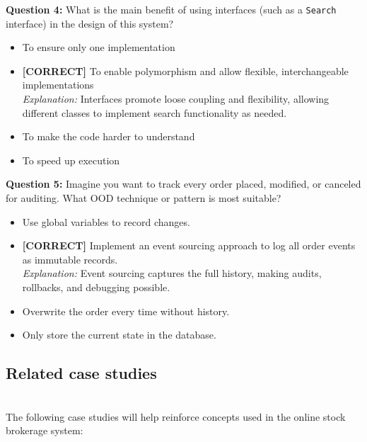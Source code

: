 \vspace{0.3cm}
\noindent
\textbf{Question 4:} What is the main benefit of using interfaces (such as a \texttt{Search} interface) in the design of this system?
\\[0.2cm]
\begin{itemize}
 \item To ensure only one implementation
 \item \textbf{[CORRECT]} To enable polymorphism and allow flexible, interchangeable implementations
\\[0.1cm]
\textit{Explanation:} 
Interfaces promote loose coupling and flexibility, allowing different classes to implement search functionality as needed.
 \item To make the code harder to understand
 \item To speed up execution
\end{itemize}
\vspace{0.3cm}
\noindent
\textbf{Question 5:} Imagine you want to track every order placed, modified, or canceled for auditing. What OOD technique or pattern is most suitable?
\\[0.2cm]
\begin{itemize}
 \item Use global variables to record changes.
 \item \textbf{[CORRECT]} Implement an event sourcing approach to log all order events as immutable records.
\\[0.1cm]
\textit{Explanation:} 
Event sourcing captures the full history, making audits, rollbacks, and debugging possible.
 \item Overwrite the order every time without history.
 \item Only store the current state in the database.
\end{itemize}

\subsection{Related case studies}\label{pwSttOF6Mjwt4ME0HhvW1}
\\
The following case studies will help reinforce concepts used in the online stock brokerage system:

